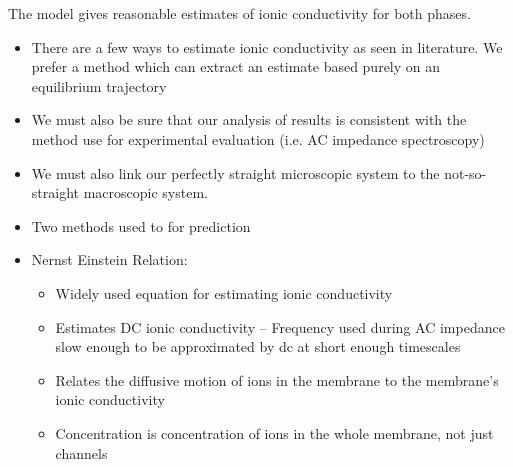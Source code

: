 \documentclass{article}
\begin{document}

	The model gives reasonable estimates of ionic conductivity for both phases.
	\begin{itemize}
		\item There are a few ways to estimate ionic conductivity as seen in literature. We prefer a method which can extract an estimate based purely on an equilibrium trajectory
		\item We must also be sure that our analysis of results is consistent with the method use for experimental evaluation (i.e. AC impedance spectroscopy)
		\item We must also link our perfectly straight microscopic system to the not-so-straight macroscopic system. %
		\item Two methods used to for prediction
		\item Nernst Einstein Relation:
		\begin{itemize}
			\item Widely used equation for estimating ionic conductivity
			\item Estimates DC ionic conductivity -- Frequency used during AC impedance slow enough to be approximated by dc at short enough timescales
			\item Relates the diffusive motion of ions in the membrane to the membrane's ionic conductivity
			\item Concentration is concentration of ions in the whole membrane, not just channels

\end{itemize}
\end{itemize}
\end{document}
